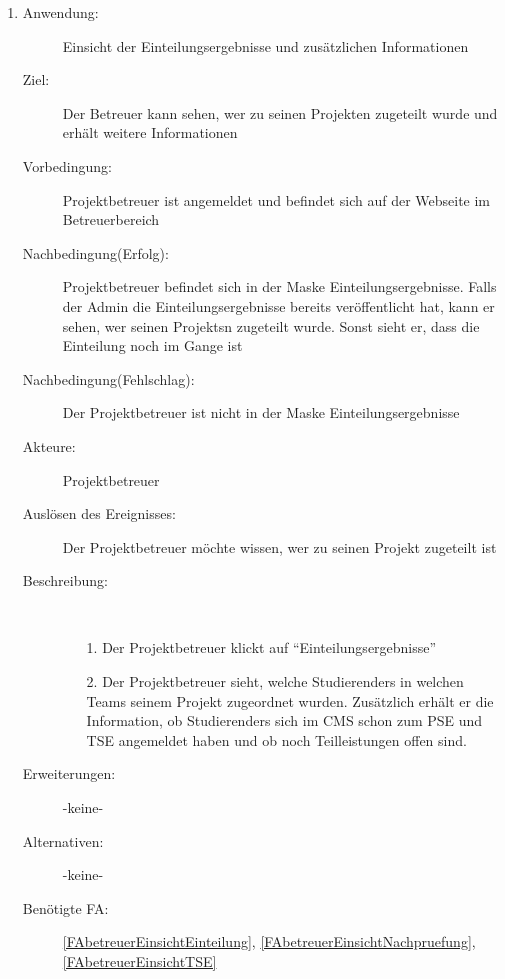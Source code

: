 \documentclass[parskip=full]{scrartcl}
\newcommand{\swtLabel}[1]{\textbf{/#1\arabic*0/}}
\begin{document}
\begin{enumerate} [label=\swtLabel{B}]
  
  \item \label{UCbetreuerEinsichtEinteilungProjekt}
  \begin{description}
  	\item[Anwendung:] Einsicht der Einteilungsergebnisse und zusätzlichen Informationen
  	\item[Ziel:] Der Betreuer kann sehen, wer zu seinen Projekten zugeteilt wurde und erhält weitere Informationen
  	\item[Vorbedingung:] \gls{Projektbetreuer} ist angemeldet und befindet sich auf der
  	Webseite im Betreuerbereich  %
  	\item[Nachbedingung(Erfolg):] \gls{Projektbetreuer} befindet sich in der Maske
  	Einteilungsergebnisse. %
  	Falls der Admin die Einteilungsergebnisse bereits veröffentlicht hat, kann er
  	sehen, wer seinen \glspl{Projekt}n zugeteilt wurde. Sonst sieht er, dass die Einteilung
  	noch im Gange ist
  	\item[Nachbedingung(Fehlschlag):] Der \gls{Projektbetreuer} ist nicht in der
  	Maske Einteilungsergebnisse
  	\item[Akteure:] \gls{Projektbetreuer}
  	\item[Auslösen des Ereignisses:] Der \gls{Projektbetreuer} möchte wissen, wer zu seinen Projekt zugeteilt ist
  	\item[Beschreibung:]~
  	\begin{enumerate}
  		\item[1.] Der \gls{Projektbetreuer} klickt auf \enquote{Einteilungsergebnisse} 
		\item[2.] Der \gls{Projektbetreuer} sieht, welche \glspl{Studierender} in welchen Teams seinem Projekt zugeordnet wurden. Zusätzlich erhält er die Information, ob \glspl{Studierender} sich im CMS schon zum PSE und TSE angemeldet haben und ob noch Teilleistungen offen sind.
  	\end{enumerate}
  	\item[Erweiterungen:] -keine-
  	
  	\item[Alternativen:] -keine-
  	
  	\item[Benötigte FA:] \ref{FAbetreuerEinsichtEinteilung}, \ref{FAbetreuerEinsichtNachpruefung}, \ref{FAbetreuerEinsichtTSE}
  \end{description}
   

\end{enumerate}
\end{document}
